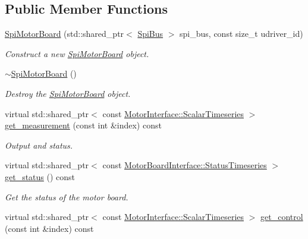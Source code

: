 \subsection*{Public Member Functions}
\begin{DoxyCompactItemize}
\item 
\hyperlink{classblmc__drivers_1_1SpiMotorBoard_a740572d586d73b678a177bc3de351f8b}{Spi\+Motor\+Board} (std\+::shared\+\_\+ptr$<$ \hyperlink{classblmc__drivers_1_1SpiBus}{Spi\+Bus} $>$ spi\+\_\+bus, const size\+\_\+t udriver\+\_\+id)
\begin{DoxyCompactList}\small\item\em Construct a new \hyperlink{classblmc__drivers_1_1SpiMotorBoard}{Spi\+Motor\+Board} object. \end{DoxyCompactList}\item 
\hyperlink{classblmc__drivers_1_1SpiMotorBoard_a3bc0c19b79504a96426646090c7fbc54}{$\sim$\+Spi\+Motor\+Board} ()
\begin{DoxyCompactList}\small\item\em Destroy the \hyperlink{classblmc__drivers_1_1SpiMotorBoard}{Spi\+Motor\+Board} object. \end{DoxyCompactList}\item 
virtual std\+::shared\+\_\+ptr$<$ const \hyperlink{classblmc__drivers_1_1MotorInterface_a49b8fc916b9f9debbd7b0988463db5cd}{Motor\+Interface\+::\+Scalar\+Timeseries} $>$ \hyperlink{classblmc__drivers_1_1SpiMotorBoard_af3793742536e6d8dc5f5782c460553fd}{get\+\_\+measurement} (const int \&index) const
\begin{DoxyCompactList}\small\item\em Output and status. \end{DoxyCompactList}\item 
virtual std\+::shared\+\_\+ptr$<$ const \hyperlink{classblmc__drivers_1_1MotorBoardInterface_ae3777e484dda60c4abe87f2b542ddfb8}{Motor\+Board\+Interface\+::\+Status\+Timeseries} $>$ \hyperlink{classblmc__drivers_1_1SpiMotorBoard_a2402ab8f55dce8c4bc35bae619e61e23}{get\+\_\+status} () const
\begin{DoxyCompactList}\small\item\em Get the status of the motor board. \end{DoxyCompactList}\item 
virtual std\+::shared\+\_\+ptr$<$ const \hyperlink{classblmc__drivers_1_1MotorInterface_a49b8fc916b9f9debbd7b0988463db5cd}{Motor\+Interface\+::\+Scalar\+Timeseries} $>$ \hyperlink{classblmc__drivers_1_1SpiMotorBoard_a52791e9a5e9fd7db347c97b399bdeee8}{get\+\_\+control} (const int \&index) const

\end{DoxyCompactItemize}
